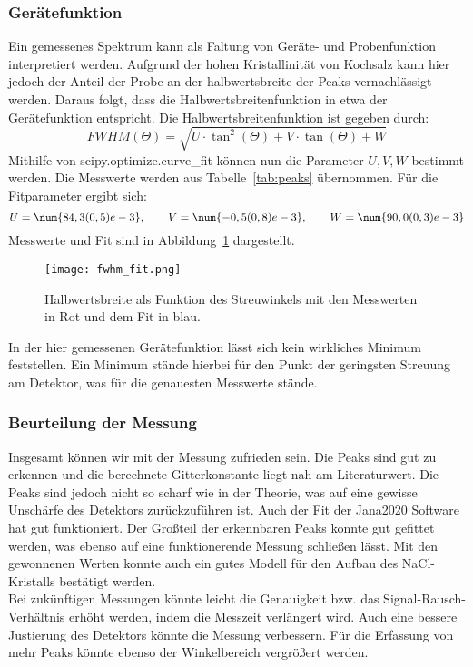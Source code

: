 \subsubsection{Gerätefunktion}
\label{sec:geraetefunktion}

Ein gemessenes Spektrum kann als Faltung von Geräte- und Probenfunktion interpretiert werden. 
Aufgrund der hohen Kristallinität von Kochsalz kann hier jedoch der Anteil der Probe an der halbwertsbreite der Peaks vernachlässigt werden. Daraus folgt, dass die Halbwertsbreitenfunktion in etwa der Gerätefunktion entspricht. Die Halbwertsbreitenfunktion ist gegeben durch:
\begin{equation}
    FWHM(\Theta) = \sqrt{U \cdot \tan^2(\Theta) + V \cdot \tan(\Theta) + W}
\end{equation}
Mithilfe von scipy.optimize.curve\_fit können nun die Parameter $U, V, W$ bestimmt werden. Die Messwerte werden aus Tabelle~\ref{tab:peaks} übernommen. Für die Fitparameter ergibt sich:
\begin{equation*}
    U = \num{84,3(0,5)e-3}, \qquad V = \num{-0,5(0,8)e-3}, \qquad W = \num{90,0(0,3)e-3}
\end{equation*}
Messwerte und Fit sind in Abbildung~\ref{fig:geraetefunktion} dargestellt.

\begin{figure}[hbt!]
    \centering
    \texttt{[image: fwhm\_fit.png]}
    \caption{Halbwertsbreite als Funktion des Streuwinkels mit den Messwerten in Rot und dem Fit in blau.}
    \label{fig:geraetefunktion}
\end{figure}

In der hier gemessenen Gerätefunktion lässt sich kein wirkliches Minimum feststellen. Ein Minimum stände hierbei für den Punkt der geringsten Streuung am Detektor, was für die genauesten Messwerte stände.


\subsubsection{Beurteilung der Messung}
Insgesamt können wir mit der Messung zufrieden sein. Die Peaks sind gut zu erkennen und die berechnete Gitterkonstante liegt nah am Literaturwert. Die Peaks sind jedoch nicht so scharf wie in der Theorie, was auf eine gewisse Unschärfe des Detektors zurückzuführen ist. Auch der Fit der Jana2020 Software hat gut funktioniert. Der Großteil der erkennbaren Peaks konnte gut gefittet werden, was ebenso auf eine funktionerende Messung schließen lässt. Mit den gewonnenen Werten konnte auch ein gutes Modell für den Aufbau des NaCl-Kristalls bestätigt werden.\\
Bei zukünftigen Messungen könnte leicht die Genauigkeit bzw. das Signal-Rausch-Verhältnis erhöht werden, indem die Messzeit verlängert wird. Auch eine bessere Justierung des Detektors könnte die Messung verbessern. Für die Erfassung von mehr Peaks könnte ebenso der Winkelbereich vergrößert werden.
\clearpage
